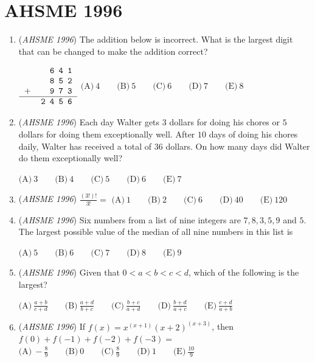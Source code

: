 \section{AHSME 1996}
        \begin{enumerate}
        	\item (\textit{AHSME 1996}) The addition below is incorrect. What is the largest digit that can be changed to make the addition correct?


 $\begin{tabular}{rr}&\ \texttt{6 4 1}\\ &\texttt{8 5 2}\\ +&\texttt{9 7 3}\\ \hline  &\texttt{2 4 5 6}\end{tabular}$
$\text{(A)}\ 4\qquad\text{(B)}\ 5\qquad\text{(C)}\ 6\qquad\text{(D)}\ 7\qquad\text{(E)}\ 8$


	\item (\textit{AHSME 1996}) Each day Walter gets $3$ dollars for doing his chores or $5$ dollars for doing them exceptionally well. After $10$ days of doing his chores daily, Walter has received a total of $36$ dollars. On how many days did Walter do them exceptionally well?


 $\text{(A)}\ 3\qquad\text{(B)}\ 4\qquad\text{(C)}\ 5\qquad\text{(D)}\ 6\qquad\text{(E)}\ 7$


	\item (\textit{AHSME 1996}) $\frac{(3!)!}{3!}=$
$\text{(A)}\ 1\qquad\text{(B)}\ 2\qquad\text{(C)}\ 6\qquad\text{(D)}\ 40\qquad\text{(E)}\ 120$


	\item (\textit{AHSME 1996}) Six numbers from a list of nine integers are $7,8,3,5, 9$ and $5$. The largest possible value of the median of all nine numbers in this list is


 $\text{(A)}\ 5\qquad\text{(B)}\ 6\qquad\text{(C)}\ 7\qquad\text{(D)}\ 8\qquad\text{(E)}\ 9$


	\item (\textit{AHSME 1996}) Given that $0 < a < b < c < d$, which of the following is the largest?


 $\text{(A)}\  \frac{a+b}{c+d} \qquad\text{(B)}\ \frac{a+d}{b+c} \qquad\text{(C)}\  \frac{b+c}{a+d} \qquad\text{(D)}\  \frac{b+d}{a+c} \qquad\text{(E)}\ \frac{c+d}{a+b}$


	\item (\textit{AHSME 1996}) If $f(x) = x^{(x+1)}(x+2)^{(x+3)}$, then $f(0)+f(-1)+f(-2)+f(-3) =$
$\text{(A)}\ -\frac{8}{9}\qquad\text{(B)}\ 0\qquad\text{(C)}\ \frac{8}{9}\qquad\text{(D)}\ 1\qquad\text{(E)}\ \frac{10}{9}$



\end{enumerate}
